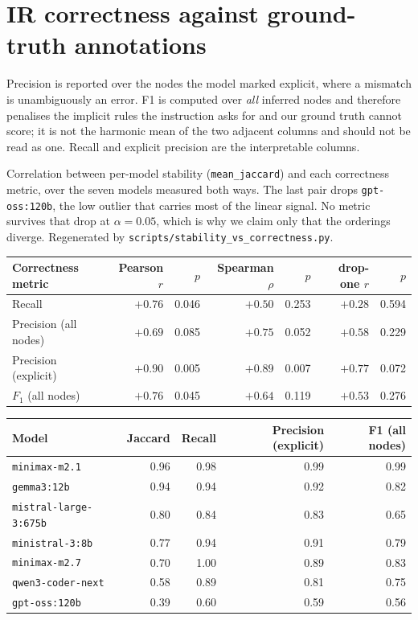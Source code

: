\documentclass{article}
\begin{document}
\section{IR correctness against ground-truth annotations}
\label{app:correctness}

Precision is reported over the nodes the model marked explicit, where a mismatch is unambiguously an error. F1 is computed over \emph{all} inferred nodes and therefore penalises the implicit rules the instruction asks for and our ground truth cannot score; it is not the harmonic mean of the two adjacent columns and should not be read as one. Recall and explicit precision are the interpretable columns.

Correlation between per-model stability (\texttt{mean\_jaccard}) and each correctness metric, over the seven models measured both ways. The last pair drops \texttt{gpt-oss:120b}, the low outlier that carries most of the linear signal. No metric survives that drop at $\alpha=0.05$, which is why we claim only that the orderings diverge. Regenerated by \texttt{scripts/stability\_vs\_correctness.py}.

\begin{center}
\small
\begin{tabular}{lrrrrrr}
\toprule
Correctness metric & Pearson $r$ & $p$ & Spearman $\rho$ & $p$ & drop-one $r$ & $p$ \\
\midrule
Recall & $+0.76$ & 0.046 & $+0.50$ & 0.253 & $+0.28$ & 0.594 \\
Precision (all nodes) & $+0.69$ & 0.085 & $+0.75$ & 0.052 & $+0.58$ & 0.229 \\
Precision (explicit) & $+0.90$ & 0.005 & $+0.89$ & 0.007 & $+0.77$ & 0.072 \\
$F_1$ (all nodes) & $+0.76$ & 0.045 & $+0.64$ & 0.119 & $+0.53$ & 0.276 \\
\bottomrule
\end{tabular}
\end{center}


\begin{center}
\small
\begin{tabular}{lrrrr}
\toprule
Model & Jaccard & Recall & Precision (explicit) & F1 (all nodes) \\
\midrule
\texttt{minimax-m2.1}         & 0.96 & 0.98 & 0.99 & 0.99 \\
\texttt{gemma3:12b}           & 0.94 & 0.94 & 0.92 & 0.82 \\
\texttt{mistral-large-3:675b} & 0.80 & 0.84 & 0.83 & 0.65 \\
\texttt{ministral-3:8b}       & 0.77 & 0.94 & 0.91 & 0.79 \\
\texttt{minimax-m2.7}         & 0.70 & 1.00 & 0.89 & 0.83 \\
\texttt{qwen3-coder-next}     & 0.58 & 0.89 & 0.81 & 0.75 \\
\texttt{gpt-oss:120b}         & 0.39 & 0.60 & 0.59 & 0.56 \\
\bottomrule
\end{tabular}
\end{center}
\end{document}
